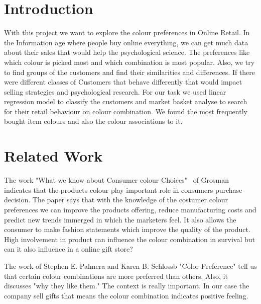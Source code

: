 \documentclass[11pt]{article}
\title{\MakeMeBlue{The colour preferences in Online Retail Store}}
\author{Uchralt Temuulen}
\date{2018 07 08}
\begin{document}
\maketitle

\section{Introduction}

With this project we want to explore the colour preferences in Online Retail. 
In the Information age where people buy online everything, we can get much data about their sales that would help the psychological science. The preferences like which colour is picked most and which combination is most popular.
Also, we try to find groups of the customers and find their similarities and differences. If there were different classes of Customers that behave differently that would impact selling strategies and psychological research. 
For our task we used linear regression model to classify the customers and market basket analyse to search for their retail behaviour on colour combination. 
We found the most frequently bought item colours and also the colour associations to it.
\\


\section{Related Work}
The work "What we know about Consumer colour Choices"~\cite{a} of Grosman indicates that the products colour play important role in consumers purchase decision.
The paper says that with the knowledge of the costumer colour preferences we can improve the products offering, reduce manufacturing costs and predict new trends immerged in which the marketers feel. It also allows the consumer to make fashion statements which improve the quality of the product. High involvement in product can influence the colour combination in survival but can it also influence in a online gift store?  


The work of Stephen E. Palmera and Karen B. Schlossb   "Color Preference"\cite{b} tell us that certain colour combinations are more preferred than others. Also, it discusses "why they like them." The context is really important. In our case the company sell gifts that means the colour combination indicates positive feeling.    
\end{document}
